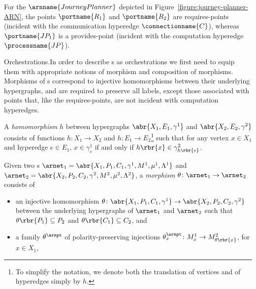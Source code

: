 \documentclass{LMCS}
\begin{document}
  \noindent For the  \(\arnname{JourneyPlanner}\) depicted in Figure~\ref{figure:journey-planner-ARN}, the points \(\portname{R_{1}}\) and \(\portname{R_{2}}\) are requires-points (incident with the communication hyperedge \(\connectionname{C}\)), whereas \(\portname{JP_{1}}\) is a provides-point (incident with the computation hyperedge \(\processname{JP}\)).

  \begin{minisection}{Orchestrations.}In order to describe s as orchestrations we first need to equip them with appropriate notions of morphism and composition of morphisms.
    Morphisms of s correspond to injective homomorphisms between their underlying hypergraphs, and are required to preserve all labels, except those associated with points that, like the requires-points, are not incident with computation hyperedges.

    \begin{defi}
      A \emph{homomorphism} \(h\) between hypergraphs \(\abr{X_{1}, E_{1}, \gamma^{1}}\) and \(\abr{X_{2}, E_{2}, \gamma^{2}}\) consists of functions \(h \colon X_{1} \to X_{2}\) and \(h \colon E_{1} \to E_{2}\)\footnote{To simplify the notation, we denote both the translation of vertices and of hyperedges simply by \(h\).} such that for any vertex \(x \in X_{1}\) and hyperedge \(e \in E_{1}\), \(x \in \gamma^{1}_{e}\) if and only if \(h\rbr{x} \in \gamma^{2}_{h\rbr{e}}\).
    \end{defi}

    \begin{defi}
      Given two s \(\arnet_{1} = \abr{X_{1}, P_{1}, C_{1}, \gamma^{1}, M^{1}, \mu^{1}, \Lambda^{1}}\) and \(\arnet_{2} = \abr{X_{2}, P_{2}, C_{2}, \gamma^{2}, M^{2}, \mu^{2}, \Lambda^{2}}\), a \emph{morphism} \(\theta \colon \arnet_{1} \to \arnet_{2}\) consists of
      \begin{itemize}
        
      \item an injective homomorphism \(\theta \colon \abr{X_{1}, P_{1}, C_{1}, \gamma^{1}} \to \abr{X_{2}, P_{2}, C_{2}, \gamma^{2}}\) between the underlying hypergraphs of \(\arnet_{1}\) and \(\arnet_{2}\) such that \(\theta\rbr{P_{1}} \subseteq P_{2}\) and \(\theta\rbr{C_{1}} \subseteq C_{2}\), and
        
      \item a family \(\theta^{\arnpt}\) of polarity-preserving injections \(\theta^{\arnpt}_{x} \colon M^{1}_{x} \to M^{2}_{\theta\rbr{x}}\), for \({x \in X_{1}}\),
        

\end{itemize}
\end{defi}
\end{minisection}
\end{document}
